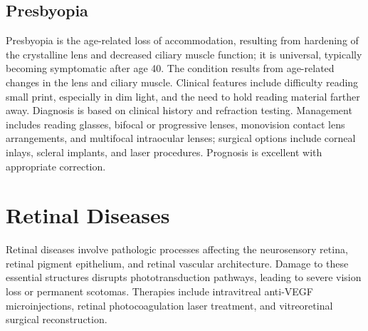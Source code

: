 \subsection{Presbyopia}
\label{sec:Presbyopia}
Presbyopia is the age-related loss of accommodation, resulting from hardening of the crystalline lens and decreased ciliary muscle function; it is universal, typically becoming symptomatic after age 40. The condition results from age-related changes in the lens and ciliary muscle. Clinical features include difficulty reading small print, especially in dim light, and the need to hold reading material farther away. Diagnosis is based on clinical history and refraction testing. Management includes reading glasses, bifocal or progressive lenses, monovision contact lens arrangements, and multifocal intraocular lenses; surgical options include corneal inlays, scleral implants, and laser procedures. Prognosis is excellent with appropriate correction.

\section{Retinal Diseases}




Retinal diseases involve pathologic processes affecting the neurosensory retina, retinal pigment epithelium, and retinal vascular architecture. Damage to these essential structures disrupts phototransduction pathways, leading to severe vision loss or permanent scotomas. Therapies include intravitreal anti-VEGF microinjections, retinal photocoagulation laser treatment, and vitreoretinal surgical reconstruction.





\label{sec:Retinal Diseases}

